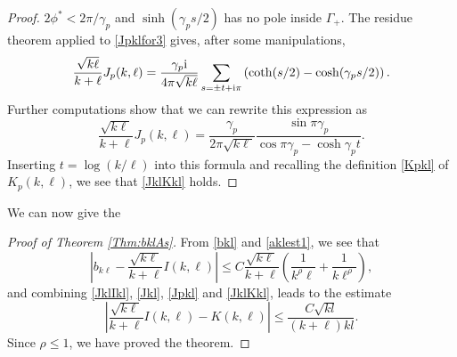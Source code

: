 \documentclass{article}
\numberwithin{equation}{section}
\numberwithin{figure}{section}
\theoremstyle{plain}
\theoremstyle{plain}
\numberwithin{thm}{section}
\theoremstyle{remark}
\newcommand{\I}{{\rm i}}
\let \le \leqslant
\begin{document}
\begin{proof}
$2\phi^*<2\pi/\gamma_p$ and $\sinh(\gamma_ps/2)$ has no pole inside $\Gamma_+$. The residue theorem applied to \eqref{Jpklfor3} gives, after some
manipulations,
\begin{equation*}
\frac{\sqrt{k\ell}}{k+\ell}J_p(k,\ell)=\frac{\gamma_p\I}{4\pi\sqrt{k\ell}}\sum_{s=\pm t+\I\pi}\left(\coth(s/2)-\cosh(\gamma_ps/2)\right).
\end{equation*}
Further computations show that we can rewrite this expression as
\begin{equation}\label{Jpklfor4}
\frac{\sqrt{k\ell}}{k+\ell}J_p(k,\ell)=\frac{\gamma_p}{2\pi\sqrt{k\ell}}\frac{\sin\pi\gamma_p}{\cos\pi\gamma_p-\cosh\gamma_pt}.
\end{equation}
Inserting $t=\log(k/\ell)$ into this formula and recalling the definition \eqref{Kpkl} of $K_p(k,\ell)$, we see that \eqref{JklKkl} holds.
\end{proof}

We can now give the

\begin{proof}[Proof of Theorem \ref{Thm:bklAs}]
From \eqref{bkl} and \eqref{aklest1}, we see that
\begin{equation*}
\left|b_{k\ell}-\frac{\sqrt{k\ell}}{k+\ell}I(k,\ell)\right|\le C\frac{\sqrt{k\ell}}{k+\ell}\left(\frac 1{k^\rho\ell}+\frac 1{k\ell^\rho}\right),
\end{equation*}
and combining \eqref{JklIkl}, \eqref{Jkl}, \eqref{Jpkl} and \eqref{JklKkl}, leads to the estimate
\begin{equation*}
\left|\frac{\sqrt{k\ell}}{k+\ell}I(k,\ell)-K(k,\ell)\right|\le\frac{C\sqrt{kl}}{(k+\ell)kl}.
\end{equation*}
Since $\rho\le 1$, we have proved the theorem.
\end{proof}
\end{document}
